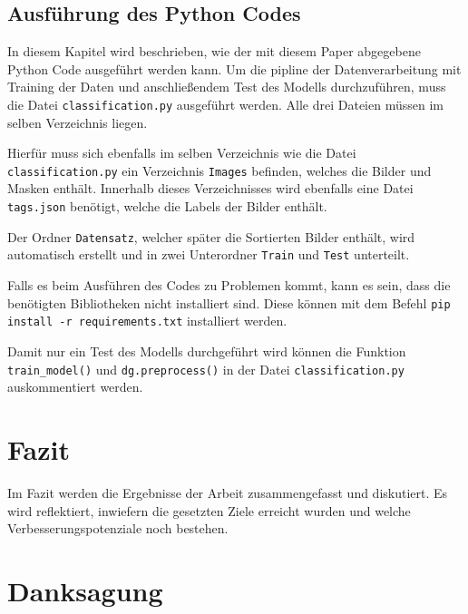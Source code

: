 \documentclass[journal,twoside,web]{ieeecolor}
\begin{document}
\subsection{Ausführung des Python Codes}

In diesem Kapitel wird beschrieben, wie der mit diesem Paper abgegebene Python Code ausgeführt werden kann.
Um die pipline der Datenverarbeitung mit Training der Daten und anschließendem Test des Modells durchzuführen, muss die Datei \texttt{classification.py} ausgeführt werden. Alle drei Dateien müssen im selben Verzeichnis liegen.

Hierfür muss sich ebenfalls im selben Verzeichnis wie die Datei \texttt{classification.py} ein Verzeichnis \texttt{Images} befinden, welches die Bilder und Masken enthält. Innerhalb dieses Verzeichnisses wird ebenfalls eine Datei \texttt{tags.json} benötigt, welche die Labels der Bilder enthält.

Der Ordner \texttt{Datensatz}, welcher später die Sortierten Bilder enthält, wird automatisch erstellt und in zwei Unterordner \texttt{Train} und \texttt{Test} unterteilt.

Falls es beim Ausführen des Codes zu Problemen kommt, kann es sein, dass die benötigten Bibliotheken nicht installiert sind. Diese können mit dem Befehl \texttt{pip install -r requirements.txt} installiert werden.

Damit nur ein Test des Modells durchgeführt wird können die Funktion \texttt{train\_model()} und \texttt{dg.preprocess()} in der Datei \texttt{classification.py} auskommentiert werden.


\section{Fazit}
Im Fazit werden die Ergebnisse der Arbeit zusammengefasst und diskutiert. Es wird reflektiert, inwiefern die gesetzten Ziele erreicht wurden und welche Verbesserungspotenziale noch bestehen.








\appendices


\section*{Danksagung}
\end{document}
